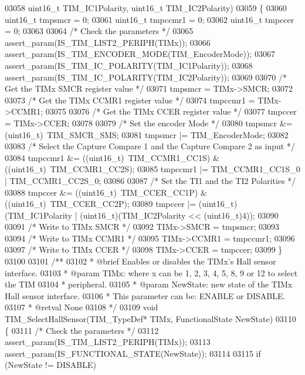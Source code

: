 \begin{DoxyCode}
03058                                 uint16\_t TIM\_IC1Polarity, uint16\_t TIM\_IC2Polarity)
03059 \{
03060   uint16\_t tmpsmcr = 0;
03061   uint16\_t tmpccmr1 = 0;
03062   uint16\_t tmpccer = 0;
03063 
03064   \textcolor{comment}{/* Check the parameters */}
03065   assert_param(IS\_TIM\_LIST2\_PERIPH(TIMx));
03066   assert_param(IS\_TIM\_ENCODER\_MODE(TIM\_EncoderMode));
03067   assert_param(IS\_TIM\_IC\_POLARITY(TIM\_IC1Polarity));
03068   assert_param(IS\_TIM\_IC\_POLARITY(TIM\_IC2Polarity));
03069 
03070   \textcolor{comment}{/* Get the TIMx SMCR register value */}
03071   tmpsmcr = TIMx->SMCR;
03072 
03073   \textcolor{comment}{/* Get the TIMx CCMR1 register value */}
03074   tmpccmr1 = TIMx->CCMR1;
03075 
03076   \textcolor{comment}{/* Get the TIMx CCER register value */}
03077   tmpccer = TIMx->CCER;
03078 
03079   \textcolor{comment}{/* Set the encoder Mode */}
03080   tmpsmcr &= (uint16\_t)~TIM_SMCR_SMS;
03081   tmpsmcr |= TIM\_EncoderMode;
03082 
03083   \textcolor{comment}{/* Select the Capture Compare 1 and the Capture Compare 2 as input */}
03084   tmpccmr1 &= ((uint16\_t)~TIM_CCMR1_CC1S) & ((uint16\_t)~TIM_CCMR1_CC2S);
03085   tmpccmr1 |= TIM_CCMR1_CC1S_0 | TIM_CCMR1_CC2S_0;
03086 
03087   \textcolor{comment}{/* Set the TI1 and the TI2 Polarities */}
03088   tmpccer &= ((uint16\_t)~TIM_CCER_CC1P) & ((uint16\_t)~TIM_CCER_CC2P);
03089   tmpccer |= (uint16\_t)(TIM\_IC1Polarity | (uint16\_t)(TIM\_IC2Polarity << (uint16\_t)4));
03090 
03091   \textcolor{comment}{/* Write to TIMx SMCR */}
03092   TIMx->SMCR = tmpsmcr;
03093 
03094   \textcolor{comment}{/* Write to TIMx CCMR1 */}
03095   TIMx->CCMR1 = tmpccmr1;
03096 
03097   \textcolor{comment}{/* Write to TIMx CCER */}
03098   TIMx->CCER = tmpccer;
03099 \}
03100 
03101 \textcolor{comment}{/**}
03102 \textcolor{comment}{  * @brief  Enables or disables the TIMx's Hall sensor interface.}
03103 \textcolor{comment}{  * @param  TIMx: where x can be 1, 2, 3, 4, 5, 8, 9 or 12 to select the TIM }
03104 \textcolor{comment}{  *         peripheral.}
03105 \textcolor{comment}{  * @param  NewState: new state of the TIMx Hall sensor interface.}
03106 \textcolor{comment}{  *          This parameter can be: ENABLE or DISABLE.}
03107 \textcolor{comment}{  * @retval None}
03108 \textcolor{comment}{  */}
03109 \textcolor{keywordtype}{void} TIM_SelectHallSensor(TIM\_TypeDef* TIMx, FunctionalState NewState)
03110 \{
03111   \textcolor{comment}{/* Check the parameters */}
03112   assert_param(IS\_TIM\_LIST2\_PERIPH(TIMx));
03113   assert_param(IS\_FUNCTIONAL\_STATE(NewState));
03114 
03115   \textcolor{keywordflow}{if} (NewState != DISABLE)

\end{DoxyCode}
